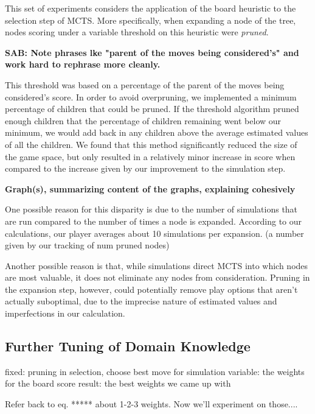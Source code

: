 \documentclass[letterpaper]{article}
\begin{document}
This set of experiments considers the application of the board heuristic to the selection step of MCTS. More specifically, when expanding a node of the tree, nodes scoring under a variable threshold on this heuristic were {\it pruned}. 

{\bf SAB: Note phrases lke "parent of the moves being considered's" and work hard to rephrase more cleanly.}

This threshold was based on a percentage of the parent of the moves being considered's score. In order to avoid overpruning, we implemented a minimum percentage of children that could be pruned. If the threshold algorithm pruned enough children that the percentage of children remaining went below our minimum, we would add back in any children above the average estimated values of all the children. We found that this method significantly reduced the size of the game space, but only resulted in a relatively minor increase in score when compared to the increase given by our improvement to the simulation step.

{\bf Graph(s), summarizing content of the graphs, explaining cohesively}

One possible reason for this disparity is due to the number of simulations that are run compared to the number of times a node is expanded. According to our calculations, our player averages about 10 simulations per expansion. (a number given by our tracking of num pruned nodes) 

Another possible reason is that, while simulations direct MCTS into which nodes are most valuable, it does not eliminate any nodes from consideration. Pruning in the expansion step, however, could potentially remove play options that aren’t actually suboptimal, due to the imprecise nature of estimated values and imperfections in our calculation.

\subsection{Further Tuning of Domain Knowledge}

fixed: pruning in selection, choose best move for simulation
variable: the weights for the board score
result: the best weights we came up with

Refer back to eq. ***** about 1-2-3 weights. Now we'll experiment on those....
\end{document}
